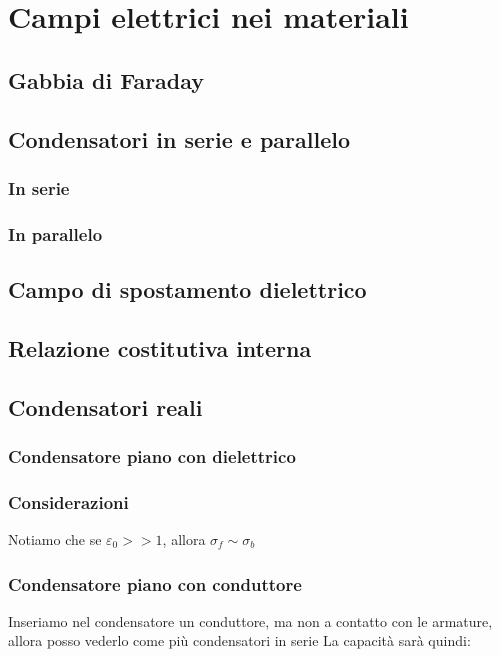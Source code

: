 \documentclass{book}
\begin{document}
\chapter{Campi elettrici nei materiali}
\section{Gabbia di Faraday}
\section{Condensatori in serie e parallelo}
\subsection{In serie}
\subsection{In parallelo}
\section{Campo di spostamento dielettrico}
\section{Relazione costitutiva interna}
\section{Condensatori reali}

\subsection{Condensatore piano con dielettrico}











\subsection{Considerazioni}




Notiamo che se $\varepsilon_0 >> 1$, allora $\sigma_f \sim \sigma_b$

\subsection{Condensatore piano con conduttore}
Inseriamo nel condensatore un conduttore, ma non a contatto con le armature, allora posso vederlo come più condensatori in serie
La capacità sarà quindi:
\end{document}
